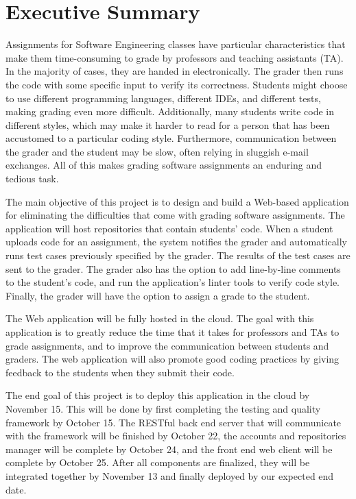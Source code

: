 \part*{Executive Summary}

Assignments for Software Engineering classes have particular characteristics
that make them time-consuming to grade by professors and teaching assistants
(TA). In the majority of cases, they are handed in electronically. The grader
then runs the code with some specific input to verify its correctness. Students
might choose to use different programming languages, different IDEs, and
different tests, making grading even more difficult. Additionally, many students
write code in different styles, which may make it harder to read for a person
that has been accustomed to a particular coding style. Furthermore,
communication between the grader and the student may be slow, often relying in
sluggish e-mail exchanges. All of this makes grading software assignments an
enduring and tedious task.

The main objective of this project is to design and build a Web-based
application  for eliminating the difficulties that come with grading software
assignments. The application will host repositories that contain students' code.
When a student uploads code for an assignment, the system notifies the grader
and automatically runs test cases previously specified by the grader. The
results of the test cases are sent to the grader. The grader also has the option
to add line-by-line comments to the student's code, and run the application's
linter tools to verify code style. Finally, the grader will have the option to
assign a grade to the student.

The Web application will be fully hosted in the cloud. The goal with this
application is to greatly reduce the time that it takes for professors and TAs
to grade assignments, and to improve the communication between students and
graders. The web application will also promote good coding practices by giving
feedback to the students when they submit their code.

The end goal of this project is to deploy this application in the cloud by
November 15. This will be done by first completing the testing and quality
framework by October 15. The RESTful back end server that will communicate
with the framework will be finished by October 22, the accounts and repositories
manager will be complete by October 24, and the front end web client will be
complete by October 25. After all components are finalized, they will be
integrated together by November 13 and finally deployed by our expected end
date.

